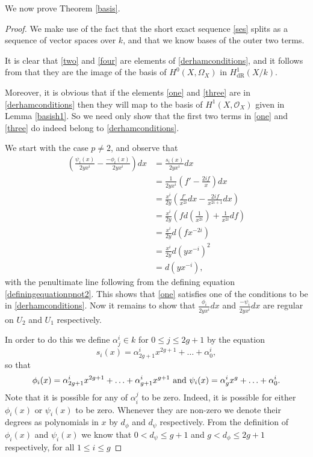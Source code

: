 \documentclass[draft, 11pt]{article} %
\theoremstyle{plain}
\theoremstyle{remark}
\newcommand{\hone}{H^1(X,\mathcal{O}_X)}
\newcommand{\derhamhone}{H_{\text {dR}}^1(X/k)}
\begin{document}
We now prove Theorem \ref{basis}.

\begin{proof}
We make use of the fact that the short exact sequence \eqref{ses} splits as a sequence of vector spaces over $k$, and that we know bases of the outer two terms.

It is clear that \eqref{two} and \eqref{four} are elements of \eqref{derhamconditions}, and it follows from \cite[Thm 6.1]{faithfulaction} that they are the image of the basis of $H^0(X,\Omega_X)$ in $\derhamhone$.

Moreover, it is obvious that if the elements \eqref{one} and \eqref{three} are in \eqref{derhamconditions} then they will map to the basis of $\hone$ given in Lemma \ref{basish1}.
So we need only show that the first two terms in \eqref{one} and \eqref{three} do indeed belong to \eqref{derhamconditions}.


We start with the case $p\neq 2$, and observe that
\begin{align*}
\left(  \frac{\psi_i(x)}{2yx^i}  - \frac{-\phi_i(x)}{2yx^i} \right) dx & =  \frac{s_i(x)}{2yx^i} dx \\
& =  \frac{1}{2yx^i} \left( f' - \frac{2if}{x} \right) dx \\
& =  \frac{x^i}{2y} \left( \frac{f'}{x^{2i}}dx -\frac{2if}{x^{2i+1}} dx \right) \\
& =  \frac{x^i}{2y} \left( fd\left(\frac{1}{x^{2i}}\right) + \frac{1}{x^{2i}}df \right) \\
& =  \frac{x^i}{2y}d(fx^{-2i}) \\
& =  \frac{x^i}{2y} d\left(yx^{-i}\right)^2 \\
& =  d(yx^{-i}),
\end{align*}
with the penultimate line following from the defining equation \eqref{definingequationpnot2}.
This shows that \eqref{one} satisfies one of the conditions to be in \eqref{derhamconditions}.
Now it remains to show that $\frac{\phi_i}{2yx^i}dx$ and $\frac{-\psi_i}{2yx^i}dx$ are regular on $U_2$ and $U_1$ respectively.



In order to do this we define $\alpha^i_j \in k$ for $0\leq j \leq 2g+1$ by the equation
\[
s_i(x) = \alpha^i_{2g+1}x^{2g+1} + \ldots + \alpha^i_0,
\]
so that
\[
\phi_i(x) = \alpha^i_{2g+1}x^{2g+1} + \ldots + \alpha^i_{g+1}x^{g+1} \ {\rm and } \ \psi_i(x) = \alpha^i_gx^g + \ldots + \alpha^i_0.
\]
Note that it is possible for any of $\alpha_i^j$ to be zero. Indeed, it is possible for either $\phi_i(x)$ or $\psi_i(x)$ to be zero.
Whenever they are non-zero we denote their degrees as polynomials in $x$ by $d_\phi$ and $d_\psi$ respectively. From the definition of $\phi_i(x)$ and $\psi_i(x)$ we know that $0 < d_\psi \leq g+1$ and $g < d_\phi \leq 2g+1$ respectively, for all $1 \leq i \leq g$



\end{proof}
\end{document}
